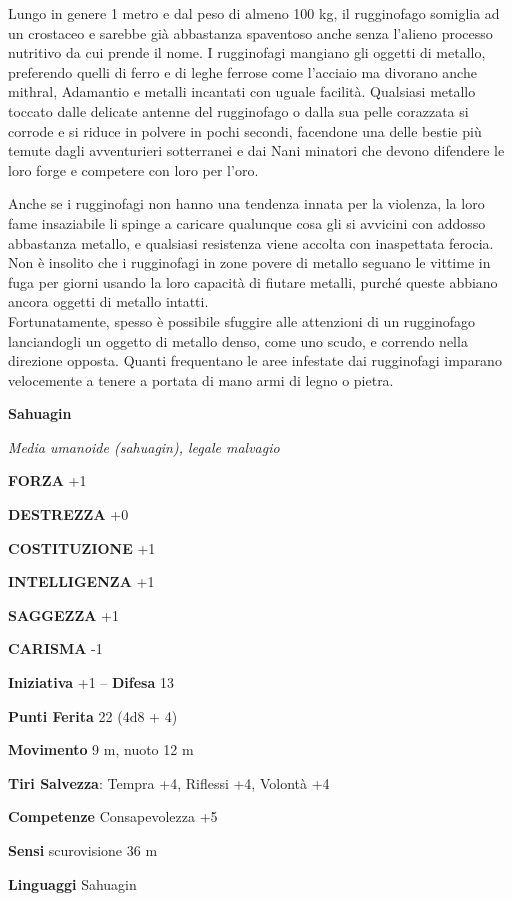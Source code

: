 \begin{multicols}{2}
Lungo in genere 1 metro e dal peso di almeno 100 kg, il rugginofago somiglia ad un crostaceo e sarebbe già abbastanza spaventoso anche senza l'alieno processo nutritivo da cui prende il nome. I rugginofagi mangiano gli oggetti di metallo, preferendo quelli di ferro e di leghe ferrose come l'acciaio ma divorano anche mithral, Adamantio e metalli incantati con uguale facilità. Qualsiasi metallo toccato dalle delicate antenne del rugginofago o dalla sua pelle corazzata si corrode e si riduce in polvere in pochi secondi, facendone una delle bestie più temute dagli avventurieri sotterranei e dai Nani minatori che devono difendere le loro forge e competere con loro per l'oro.

Anche se i rugginofagi non hanno una tendenza innata per la violenza, la loro fame insaziabile li spinge a caricare qualunque cosa gli si avvicini con addosso abbastanza metallo, e qualsiasi resistenza viene accolta con inaspettata ferocia. Non è insolito che i rugginofagi in zone povere di metallo seguano le vittime in fuga per giorni usando la loro capacità di fiutare metalli, purché queste abbiano ancora oggetti di metallo intatti.\\
Fortunatamente, spesso è possibile sfuggire alle attenzioni di un rugginofago lanciandogli un oggetto di metallo denso, come uno scudo, e correndo nella direzione opposta. Quanti frequentano le aree infestate dai rugginofagi imparano velocemente a tenere a portata di mano armi di legno o pietra.


\medskip{}\textbf{Sahuagin}

\textit{Media umanoide (sahuagin), legale malvagio}

\textbf{FORZA} +1

\textbf{DESTREZZA} +0

\textbf{COSTITUZIONE} +1

\textbf{INTELLIGENZA} +1

\textbf{SAGGEZZA} +1

\textbf{CARISMA} -1

\textbf{Iniziativa} +1 -- \textbf{Difesa} 13

\textbf{Punti Ferita} 22 (4d8 + 4)

\textbf{Movimento} 9 m, nuoto 12 m

\textbf{Tiri Salvezza}: Tempra +4, Riflessi +4, Volontà +4

\textbf{Competenze} Consapevolezza +5

\textbf{Sensi} scurovisione 36 m

\textbf{Linguaggi} Sahuagin


\end{multicols}
